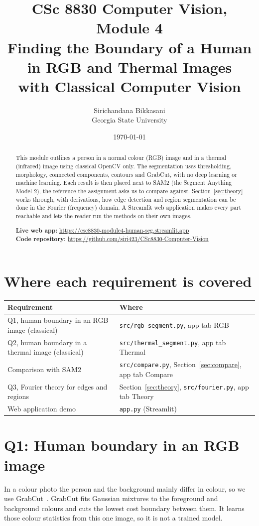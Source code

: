 \documentclass[11pt]{article}
\title{\textbf{CSc 8830 Computer Vision, Module 4}\\[2pt]
Finding the Boundary of a Human in RGB and Thermal Images\\
with Classical Computer Vision}
\author{Sirichandana Bikkasani \\ Georgia State University}
\date{\today}
\begin{document}
\maketitle

\begin{abstract}
This module outlines a person in a normal colour (RGB) image and in a thermal
(infrared) image using classical OpenCV only. The segmentation uses
thresholding, morphology, connected components, contours and GrabCut, with no
deep learning or machine learning. Each result is then placed next to SAM2 (the
Segment Anything Model 2), the reference the assignment asks us to compare against.
Section~\ref{sec:theory} works through, with derivations, how edge detection and
region segmentation can be done in the Fourier (frequency) domain. A Streamlit
web application makes every part reachable and lets the reader run the methods on
their own images.

\smallskip
\noindent\textbf{Live web app:} \url{https://csc8830-module4-human-seg.streamlit.app}\\
\textbf{Code repository:} \url{https://github.com/siri423/CSc8830-Computer-Vision}
\end{abstract}

\section{Where each requirement is covered}
\begin{center}
\begin{tabular}{ll}
\toprule
\textbf{Requirement} & \textbf{Where} \\
\midrule
Q1, human boundary in an RGB image (classical) & \texttt{src/rgb\_segment.py}, app tab RGB \\
Q2, human boundary in a thermal image (classical) & \texttt{src/thermal\_segment.py}, app tab Thermal \\
Comparison with SAM2 & \texttt{src/compare.py}, Section~\ref{sec:compare}, app tab Compare \\
Q3, Fourier theory for edges and regions & Section~\ref{sec:theory}, \texttt{src/fourier.py}, app tab Theory \\
Web application demo & \texttt{app.py} (Streamlit) \\
\bottomrule
\end{tabular}
\end{center}

\section{Q1: Human boundary in an RGB image}
In a colour photo the person and the background mainly differ in colour, so we
use GrabCut~\cite{grabcut}. GrabCut fits Gaussian mixtures to the foreground and
background colours and cuts the lowest cost boundary between them. It learns
those colour statistics from this one image, so it is not a trained model.
\end{document}
